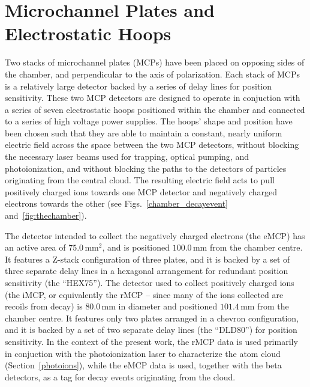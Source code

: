 \section{Microchannel Plates and Electrostatic Hoops}
\label{section:mcps}
\label{section:field}
Two stacks of microchannel plates (MCPs) have been placed on opposing sides of the chamber, and perpendicular to the axis of polarization.  Each stack of MCPs is a relatively large detector backed by a series of delay lines for position sensitivity.  These two MCP detectors are designed to operate in conjuction with a series of seven electrostatic hoops positioned within the chamber and connected to a series of high voltage power supplies.  The hoops' shape and position have been chosen such that they are able to maintain  
a constant, nearly uniform electric field across the space between the two MCP detectors, without blocking the necessary laser beams used for trapping, optical pumping, and photoionization, and without blocking the paths to the detectors of particles originating from the central cloud.
The resulting electric field acts to pull positively charged ions towards one MCP detector and negatively charged electrons towards the other (see Figs.~\ref{chamber_decayevent} and~\ref{fig:thechamber}).  


The detector intended to collect the negatively charged electrons (the \acs{eMCP}) has an active area of $75.0\,$mm$^2$, and is positioned 
$100.0\,$mm from the chamber centre.  It features a Z-stack configuration of three plates, and it is backed by a set of three separate delay lines in a hexagonal arrangement for redundant position sensitivity (the ``HEX75'').  The detector used to collect positively charged ions (the \acs{iMCP}, or equivalently the \acs{rMCP} -- since many of the ions collected are recoils from decay) is $80.0\,$mm in diameter and positioned $101.4\,$mm from the chamber centre.  It features only two plates arranged in a chevron configuration, and it is backed by a set of two separate delay lines (the ``DLD80'') for position sensitivity.  
%
In the context of the present work, the \ac{rMCP} data is used primarily in conjuction with the photoionization laser to characterize the atom cloud (Section~\ref{photoions}), while the \ac{eMCP} data is used, together with the beta detectors, as a tag for decay events originating from the cloud. 





